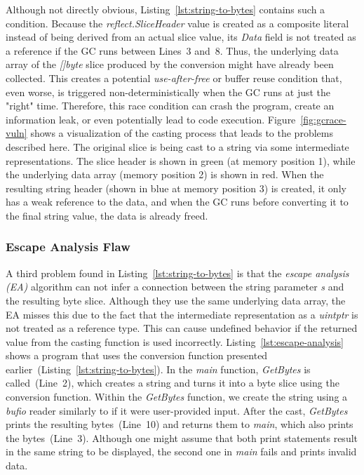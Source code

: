 Although not directly obvious, Listing~\ref{lst:string-to-bytes} contains such a condition.
Because the \textit{reflect.SliceHeader} value is created as a composite literal instead of being derived from an actual slice value, its \textit{Data} field is not treated as a reference if the GC runs between Lines~3 and~8. 
Thus, the underlying data array of the \textit{[]byte} slice produced by the conversion might have already been collected.
This creates a potential \textit{use-after-free} or buffer reuse condition that, even worse, is triggered non-deterministically when the GC runs at just the "right" time.
Therefore, this race condition can crash the program, create an information leak, or even potentially lead to code execution.
Figure~\ref{fig:gcrace-vuln} shows a visualization of the casting process that leads to the problems described here.
The original slice is being cast to a string via some intermediate representations.
The slice header is shown in green (at memory position 1), while the underlying data array (memory position 2) is shown in red.
When the resulting string header (shown in blue at memory position 3) is created, it only has a weak reference to the data, and when the GC runs before converting it to the final string value, the data is already freed.




\subsubsection*{Escape Analysis Flaw}

A third problem found in Listing~\ref{lst:string-to-bytes} is that the \textit{escape analysis (EA)} algorithm can not infer a connection between the string parameter \textit{s} and the resulting byte slice.
Although they use the same underlying data array, the EA misses this due to the fact that the intermediate representation as a \textit{uintptr} is not treated as a reference type.
This can cause undefined behavior if the returned value from the casting function is used incorrectly.
Listing~\ref{lst:escape-analysis} shows a program that uses the conversion function presented earlier~(Listing~\ref{lst:string-to-bytes}).
In the \textit{main} function, \textit{GetBytes} is called~(Line~2), which creates a string and turns it into a byte slice using the conversion function.
Within the \textit{GetBytes} function, we create the string using a \textit{bufio} reader similarly to if it were user-provided input.
After the cast, \textit{GetBytes} prints the resulting bytes~(Line~10) and returns them to \textit{main}, which also prints the bytes~(Line~3).
Although one might assume that both print statements result in the same string to be displayed, the second one in \textit{main} fails and prints invalid data.


